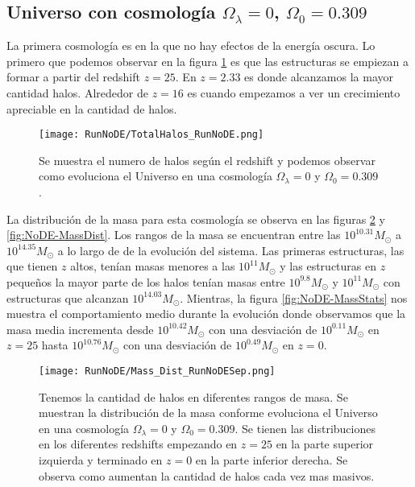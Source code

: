 
\subsection{Universo con cosmología \texorpdfstring{$\Omega_\lambda = 0$, $\Omega_0 = 0.309$ }{Omega lambda = 0, Omega 0 = 0.309}  }

La primera cosmología es en la que no hay efectos de la energía oscura. Lo primero que podemos observar en la figura \ref{fig:NoDE_TotalHalos} es que las estructuras se empiezan a formar a partir del redshift $z=25$. En $z= 2.33$ es donde alcanzamos la mayor cantidad halos. Alrededor de $z = 16$ es cuando empezamos a ver un crecimiento apreciable en la cantidad de halos.

\begin{figure}[H]
    \centering
    \texttt{[image: RunNoDE/TotalHalos\_RunNoDE.png]}
    \caption[Evolución del número de halos en un Universo $\Omega_\lambda = 0$, $\Omega_0 = 0.309$]{\footnotesize Se muestra el numero de halos según el redshift y podemos observar como evoluciona el Universo en una cosmología $\Omega_\lambda = 0$ y $\Omega_0 = 0.309$.}
    \label{fig:NoDE_TotalHalos}
\end{figure}

La distribución de la masa para esta cosmología se observa en las figuras \ref{fig:NoDE-MassDistSep} y \ref{fig:NoDE-MassDist}. Los rangos de la masa se encuentran entre las $10^{10.31}M_\odot$ a $10^{14.35}M_\odot$ a lo largo de de la evolución del sistema. Las primeras estructuras, las que tienen $z$ altos, tenían masas menores a las $10^{11}M_\odot$ y las estructuras en $z$ pequeños la mayor parte de los halos tenían masas entre $10^{9.8}M_\odot$ y $10^{11}M_\odot$ con estructuras que alcanzan $10^{14.03}M_\odot$. Mientras, la figura \ref{fig:NoDE-MassStats} nos muestra el comportamiento medio durante la evolución donde observamos que la masa media incrementa desde $10^{10.42}M_\odot$ con una desviación de $10^{0.11}M_\odot$ en $z=25$ hasta $10^{10.76}M_\odot$ con una desviación de $10^{0.49}M_\odot$ en $z=0$.

\begin{figure}[H]
    \centering
    \texttt{[image: RunNoDE/Mass\_Dist\_RunNoDESep.png]}
    \caption[Distribución de masa en la evolución de un Universo $\Omega_\lambda = 0$, $\Omega_0 = 0.309$]{\footnotesize Tenemos la cantidad de halos en diferentes rangos de masa. Se muestran la distribución de la masa conforme evoluciona el Universo en una cosmología $\Omega_\lambda = 0$ y $\Omega_0 = 0.309$. Se tienen las distribuciones en los diferentes redshifts empezando en $z=25$ en la parte superior izquierda y terminado en $z=0$ en la parte inferior derecha. Se observa como aumentan la cantidad de halos cada vez mas masivos.}
    \label{fig:NoDE-MassDistSep}
\end{figure}

